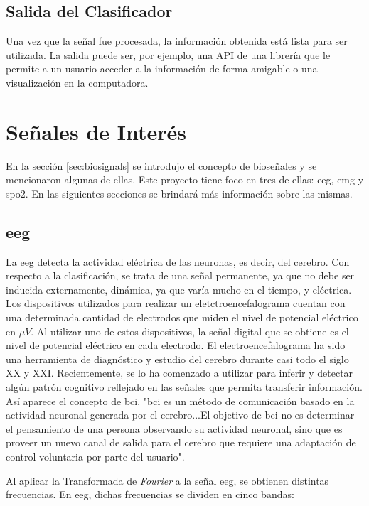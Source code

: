 \subsection{Salida del Clasificador}

Una vez que la señal fue procesada, la información obtenida está lista para ser utilizada. La salida puede ser, por ejemplo, una API de una librería que le permite a un usuario acceder a la información de forma amigable o una visualización en la computadora.

\section{Señales de Interés}

En la sección \ref{sec:biosignals} se introdujo el concepto de bioseñales y se mencionaron algunas de ellas. Este proyecto tiene foco en tres de ellas: 
\gls{eeg}, \gls{emg} y \gls{spo2}. En las siguientes secciones se brindará más información sobre las mismas.

\subsection{\gls{eeg}}

La \gls{eeg} detecta la actividad eléctrica de las neuronas, es decir, del cerebro. Con respecto a la clasificación, se trata de una señal permanente, ya que no debe ser inducida externamente, dinámica, ya que varía mucho en el tiempo, y eléctrica. Los dispositivos utilizados para realizar un eletctroencefalograma cuentan con una determinada cantidad de electrodos que miden el nivel de potencial eléctrico en $ \mu V$. Al utilizar uno de estos dispositivos, la señal digital que se obtiene es el nivel de potencial eléctrico en cada electrodo. El electroencefalograma ha sido una herramienta de diagnóstico y estudio del cerebro durante casi todo el siglo XX y XXI. Recientemente, se lo ha comenzado a utilizar para inferir y detectar algún patrón cognitivo reflejado en las señales que permita transferir información.  Así aparece el concepto de \gls{bci}. "\acrshort{bci} es un método de comunicación basado en la actividad neuronal generada por el cerebro...El objetivo de \acrshort{bci} no es determinar el pensamiento de una persona observando su actividad neuronal, sino que es proveer un nuevo canal de salida para el cerebro que requiere una adaptación de control voluntaria por parte del usuario"\cite{neural-eng}.

Al aplicar la Transformada de \emph{Fourier} a la señal \acrshort{eeg}, se obtienen distintas frecuencias. En \acrshort{eeg}, dichas frecuencias se dividen en cinco bandas:

